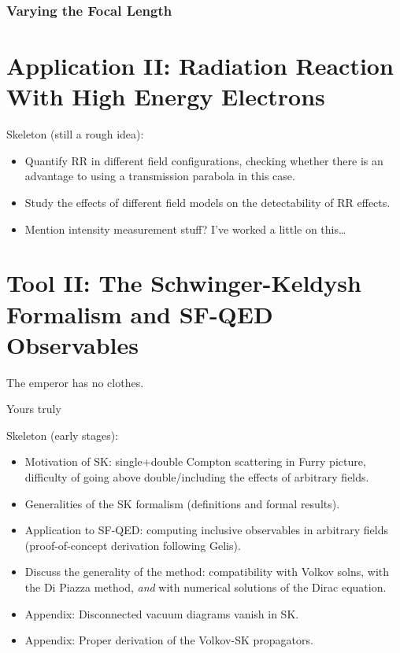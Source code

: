 \documentclass[11pt,SymmetricalJury]{inrsthesis/inrsthesis}
\begin{document}
\subsection{Varying the Focal Length}

\todo



\chapter{Application II: Radiation Reaction With High Energy Electrons}

Skeleton (still a rough idea):
  \begin{itemize}
    \item Quantify RR in different field configurations, checking whether there
          is an advantage to using a transmission parabola in this case.
    \item Study the effects of different field models on the detectability of
          RR effects.
    \item Mention intensity measurement stuff? I've worked a little on this\ldots
  \end{itemize}

\chapter{Tool II: The Schwinger-Keldysh Formalism and SF-QED Observables}

\epigraph{The emperor has no clothes.}{Yours truly}


Skeleton (early stages):
  \begin{itemize}
      \item Motivation of SK: single+double Compton scattering in Furry picture,
            difficulty of going above double/including the effects of arbitrary fields.
      \item Generalities of the SK formalism (definitions and formal results).
      \item Application to SF-QED: computing inclusive observables in
            arbitrary fields (proof-of-concept derivation following Gelis).
      \item Discuss the generality of the method: compatibility with
            Volkov solns, with the Di Piazza method, \textit{and} with numerical
            solutions of the Dirac equation.
      \item Appendix: Disconnected vacuum diagrams vanish in SK.
      \item Appendix: Proper derivation of the Volkov-SK propagators.
  \end{itemize}
\end{document}
